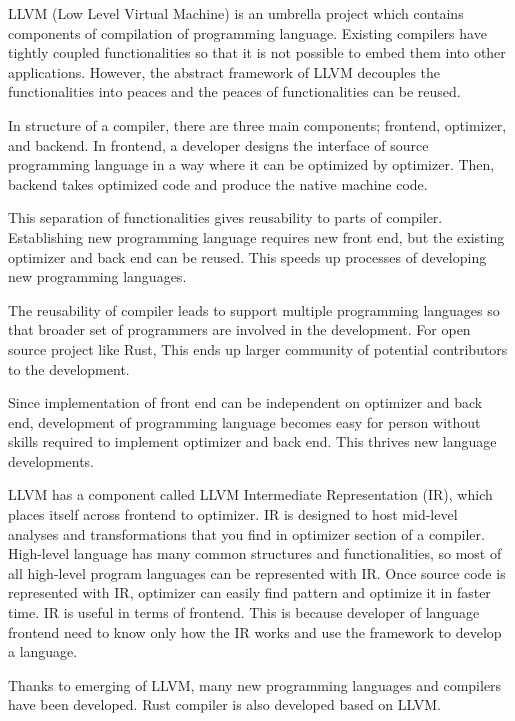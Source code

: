 LLVM (Low Level Virtual Machine) \cite{DBLP:conf/cgo/LattnerA04} is an umbrella project which contains components of compilation of programming language.
Existing compilers have tightly coupled functionalities so that it is not possible to embed them into other applications.
However, the abstract framework of LLVM decouples the functionalities into peaces and the peaces of functionalities can be reused.

In structure of a compiler, there are three main components; frontend, optimizer, and backend. 
In frontend, a developer designs the interface of source programming language in a way where it can be optimized by optimizer. 
Then, backend takes optimized code and produce the native machine code. 

This separation of functionalities gives reusability to parts of compiler. Establishing new programming language requires new front end, 
but the existing optimizer and back end can be reused. This speeds up processes of developing new programming languages.

The reusability of compiler leads to support multiple programming languages 
so that broader set of programmers are involved in the development. 
For open source project like Rust, This ends up larger community of potential contributors to the development.

Since implementation of front end can be independent on optimizer and back end, 
development of programming language becomes easy for person without skills required to implement optimizer and back end.
This thrives new language developments.

LLVM has a component called LLVM Intermediate Representation (IR), 
which places itself across frontend to optimizer. IR is designed to host mid-level analyses and transformations that you find in optimizer section of a compiler.
High-level language has many common structures and functionalities, so most of all high-level program languages can be represented with IR. 
Once source code is represented with IR, optimizer can easily find pattern and optimize it in faster time. 
IR is useful in terms of frontend. This is because developer of language frontend need to know only how the IR works and use the framework to develop a language.

Thanks to emerging of LLVM, many new programming languages and compilers have been developed. Rust compiler is also developed based on LLVM.


